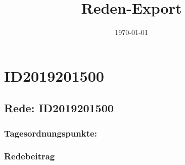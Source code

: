 \documentclass{article}
\title{Reden-Export}
\date{\today}
\begin{document}
\maketitle

\tableofcontents

\section{ID2019201500}
\subsection{Rede: ID2019201500}
\subsubsection*{Tagesordnungspunkte:}
\subsubsection*{Redebeitrag}
\end{document}
